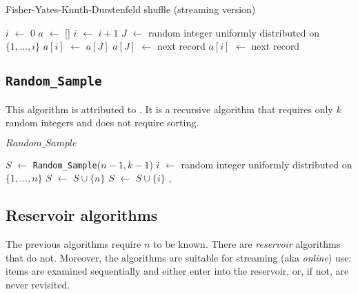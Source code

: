 \documentclass[graybox]{svmult}
\newcommand*\Let[2]{\State #1 $\gets$ #2}
\begin{document}
\begin{algorithm}                      %
\caption{Fisher-Yates-Knuth-Durstenfeld shuffle (streaming version)}          %
\label{FYKD-streaming}                           %
\begin{algorithmic}[1]               %
\Let{$i$}{0}
\Let{$a$}{[]}
    \Let{$i$}{$i+1$}
    \Let{$J$}{random integer uniformly distributed on $\{1, \dots, i\}$}
        \Let{$a[i]$}{$a[J]$}
        \Let{$a[J]$}{next record}
    \Else
        \Let{$a[i]$}{next record} 
    \EndIf
\EndWhile \\
\end{algorithmic}
\end{algorithm}

      

\subsection{\texttt{Random\_Sample}}
This algorithm is attributed to \cite{cormen_introduction_2009}.
It is a recursive algorithm that requires only $k$ random integers and does not require sorting.


\begin{algorithm}                      %
\caption{$Random\_Sample$}
\label{Random_Sample}
\begin{algorithmic}[1]               %
\Statex
{}
\Else
     \Let{$S$}{\texttt{Random\_Sample}($n-1, k-1$)}
     \Let{$i$}{random integer uniformly distributed on $\{1, \dots, n\}$} 
           \Let{$S$}{$S \cup \{n\}$}
     \Else
            \Let{$S$}{$S\cup\{i\}$}  
     \EndIf, 
\EndIf
\EndFunction
\end{algorithmic}
\end{algorithm}


\subsection{Reservoir algorithms}

The previous algorithms require $n$ to be known.
There are \emph{reservoir} algorithms that do not.
Moreover, the algorithms are suitable for streaming (aka \emph{online}) use: items are examined
sequentially and either enter into the reservoir, or, if not, are never revisited.
\end{document}

